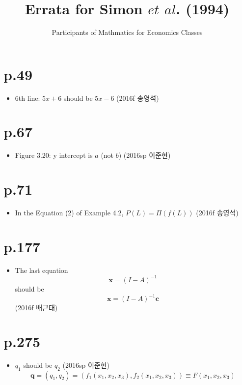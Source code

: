 \documentclass[a4paper]{article}
\title{Errata for Simon $et$ $al$. (1994)}
\author{Participants of Mathmatics for Economics Classes}
\begin{document}
\maketitle

\section{p.49} %
\label{sec:p49}
\begin{itemize}
	\item 6th line: $5x+6$ should be $5x-6$ (2016f 송영석)
\end{itemize}

\section{p.67} %
\label{sec:p67}
\begin{itemize}
	\item Figure 3.20: y intercept is $a$ (not $b$) (2016sp 이준현)
\end{itemize}

\section{p.71} %
\label{sec:p_71}
\begin{itemize}
	\item In the Equation (2) of Example 4.2, $P(L) = \Pi(f(L))$ (2016f 송영석)
\end{itemize}

\section{p.177} %
\label{sec:p_177}
\begin{itemize}
	\item The last equation
	\[
		\mathbf{x}=(I-A)^{-1}
	\]
	should be
	\[
		\mathbf{x}=(I-A)^{-1}\mathbf{c}
	\]
	(2016f 배근태)
\end{itemize}

\section{p.275} %
\label{sec:p_275}
\begin{itemize}
	\item $q_1$ should be $q_2$ (2016sp 이준현)
	\[
		\mathbf{q}=(q_1,q_2)=\left(f_1(x_1,x_2,x_3),f_2(x_1,x_2,x_3)\right)\equiv F(x_1,x_2,x_3)
	\]
\end{itemize}
\end{document}
